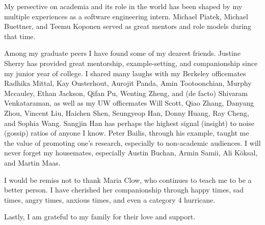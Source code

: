 \begin{acknowledgements}
My persective on academia and its role in the world has been shaped by my
multiple experiences as a software engineering intern. Michael Piatek,
Michael Buettner, and Teemu Koponen served as great mentors and role models during that time.

Among my graduate peers I have found some of my dearest friends.
Justine Sherry has provided great mentorship, example-setting, and companionship
since my junior year of college. I shared many laughs with my Berkeley officemates
Radhika Mittal, Kay Ousterhout, Aurojit Panda, Amin Tootoonchian, Murphy Mccauley, Ethan
Jackson, Qifan Pu, Wenting Zheng, and (de
facto) Shivaram Venkataraman, as well as my UW officemates Will Scott, Qiao
Zhang, Danyang Zhou, Vincent Liu, Haichen Shen, Seungyeop Han, Donny Huang, Ray Cheng, and Sophia Wang.
Sangjin Han has perhaps the highest signal (insight) to noise (gossip)
ratios of anyone I know. Peter Bailis, through his example, taught me the
value of promoting one's research, especially to non-academic audiences.
I will never forget my housemates, especially Austin Buchan, Armin
Samii, Ali K\"oksal, and Martin Maas.

I would be remiss not to thank Maria Clow, who continues to teach
me to be a better person. I have cherished her companionship through
happy times, sad times, angry times, anxious times, and even a category 4 hurricane.

Lastly, I am grateful to my family for their love and support.

%
%



\end{acknowledgements}
